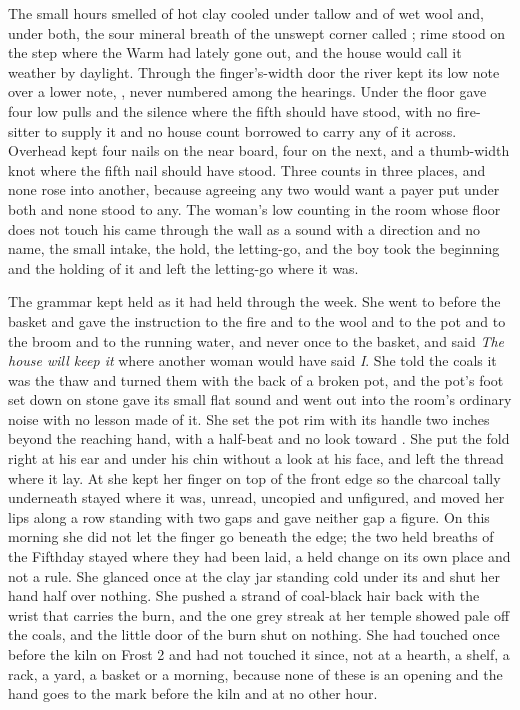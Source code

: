The small hours smelled of hot clay cooled under tallow and of wet wool and, under both, the sour mineral breath of the unswept corner called ; rime stood on the step where the Warm had lately gone out, and the house would call it weather by daylight. Through the finger's-width door the river kept its low note over a lower note, , never numbered among the hearings. Under the floor  gave four low pulls and the silence where the fifth should have stood, with no fire-sitter to supply it and no house count borrowed to carry any of it across. Overhead  kept four nails on the near board, four on the next, and a thumb-width knot where the fifth nail should have stood. Three counts in three places, and none rose into another, because agreeing any two would want a payer put under both and none stood to any. The woman's low counting in the room whose floor does not touch his came through the wall as a sound with a direction and no name, the small intake, the hold, the letting-go, and the boy took the beginning and the holding of it and left the letting-go where it was.

\scenebreak

The grammar  kept held as it had held through the week. She went to  before the basket and gave the instruction to the fire and to the wool and to the pot and to the broom and to the running water, and never once to the basket, and said \emph{The house will keep it} where another woman would have said \emph{I}. She told the coals it was the thaw and turned them with the back of a broken pot, and the pot's foot set down on stone gave its small flat sound and went out into the room's ordinary noise with no lesson made of it. She set the pot rim with its handle two inches beyond the reaching hand, with a half-beat and no look toward . She put the fold right at his ear and under his chin without a look at his face, and left the thread where it lay. At  she kept her finger on top of the front edge so the charcoal tally underneath stayed where it was, unread, uncopied and unfigured, and moved her lips along a row standing with two gaps and gave neither gap a figure. On this morning she did not let the finger go beneath the edge; the two held breaths of the Fifthday stayed where they had been laid, a held change on its own place and not a rule. She glanced once at the clay jar standing cold under its  and shut her hand half over nothing. She pushed a strand of coal-black hair back with the wrist that carries the burn, and the one grey streak at her temple showed pale off the coals, and the little door of the burn shut on nothing. She had touched  once before the kiln on Frost 2 and had not touched it since, not at a hearth, a shelf, a rack, a yard, a basket or a morning, because none of these is an opening and the hand goes to the mark before the kiln and at no other hour.

